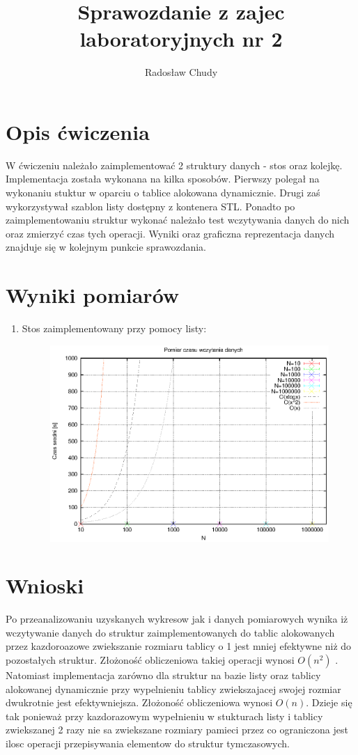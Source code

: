 \documentclass[a4paper,11pt]{article}
\title{Sprawozdanie z zajec laboratoryjnych nr 2}
\author{Radosław Chudy}
\begin{document}
\maketitle

\section{Opis ćwiczenia}
W ćwiczeniu należało zaimplementować 2 struktury danych - stos oraz kolejkę. Implementacja została wykonana na kilka sposobów. Pierwszy polegał na wykonaniu stuktur w oparciu o tablice alokowana dynamicznie. Drugi zaś wykorzystywał szablon listy dostępny z kontenera STL. Ponadto po zaimplementowaniu struktur wykonać należało test wczytywania danych do nich oraz zmierzyć czas tych operacji. Wyniki oraz graficzna reprezentacja danych znajduje się w kolejnym punkcie sprawozdania.

\section{Wyniki pomiarów}
\begin{enumerate}
 \item Stos zaimplementowany przy pomocy listy:
  \begin{figure}
  \righting
  \includegraphics{wykres_dla_stoslista.eps}
  \label{Test nr 1}
 \end{figure}

 \end{enumerate}

 \section{Wnioski}
Po przeanalizowaniu uzyskanych wykresow jak i danych pomiarowych wynika iż wczytywanie danych do struktur zaimplementowanych do tablic alokowanych przez kazdoroazowe zwiekszanie rozmiaru tablicy o 1 jest mniej efektywne niż do pozostałych struktur. Złożoność obliczeniowa takiej operacji wynosi $ O(n^{2}) $ . Natomiast implementacja zarówno dla struktur na bazie listy oraz tablicy alokowanej dynamicznie przy wypelnieniu tablicy zwiekszajacej swojej rozmiar dwukrotnie jest efektywniejsza. Złożoność obliczeniowa wynosi $ O(n) $. Dzieje się tak ponieważ przy kazdorazowym wypełnieniu w stukturach listy i tablicy zwiekszanej 2 razy nie sa zwiekszane rozmiary pamieci przez co ograniczona jest ilosc operacji przepisywania elementow do struktur tymczasowych.
 
\end{document}
